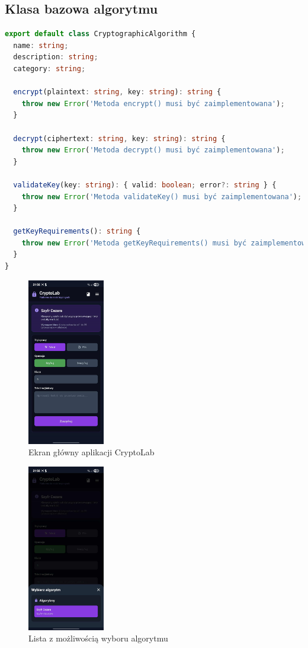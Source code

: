 \documentclass[12pt,a4paper]{article}
\begin{document}
\subsection{Klasa bazowa algorytmu}
\begin{lstlisting}[language=TypeScript, caption={Klasa abstrakcyjna CryptographicAlgorithm}]
export default class CryptographicAlgorithm {
  name: string;
  description: string;
  category: string;

  encrypt(plaintext: string, key: string): string {
    throw new Error('Metoda encrypt() musi być zaimplementowana');
  }

  decrypt(ciphertext: string, key: string): string {
    throw new Error('Metoda decrypt() musi być zaimplementowana');
  }

  validateKey(key: string): { valid: boolean; error?: string } {
    throw new Error('Metoda validateKey() musi być zaimplementowana');
  }

  getKeyRequirements(): string {
    throw new Error('Metoda getKeyRequirements() musi być zaimplementowana');
  }
}
\end{lstlisting}
\begin{figure}[H]
    \centering
    \includegraphics[width=0.3\textwidth]{img/szyfr_cezara.jpg}
    \caption{Ekran główny aplikacji CryptoLab}
    \label{fig:main}
\end{figure}
\begin{figure}[H]
    \centering
    \includegraphics[width=0.3\textwidth]{img/lista_wyboru.jpg}
    \caption{Lista z możliwością wyboru algorytmu}
    \label{fig:list}
\end{figure}
\end{document}
